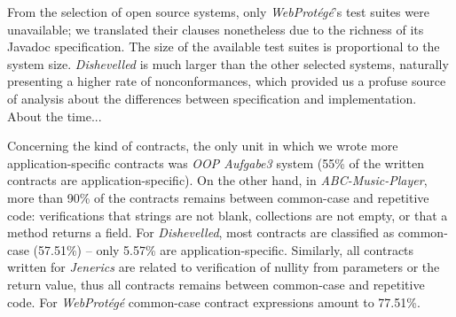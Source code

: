 


From the selection of open source systems, only \emph{WebProtégé}'s test suites were unavailable; we translated their clauses nonetheless due to the richness of its Javadoc specification.
The size of the available test suites is proportional to the system size.
\emph{Dishevelled} is much larger than the other selected systems, naturally presenting a higher rate of nonconformances, which provided us a profuse source of analysis about the differences between specification and implementation. 
About the time...



Concerning the kind of contracts, the only unit in which we wrote more
application-specific contracts was \emph{OOP Aufgabe3} system (55\% of the
written contracts are application-specific). On the other hand, in \emph{ABC-Music-Player}, more than 90\% of the contracts remains between common-case and repetitive code: verifications that strings are not blank, collections are not empty, or that a method returns a field.
For \emph{Dishevelled}, most contracts are classified as common-case (57.51\%) -- 
only 5.57\% are application-specific.
Similarly, all contracts written for \emph{Jenerics} are related to verification of nullity from parameters or the return value, thus all contracts
remains between common-case and repetitive code.
For \emph{WebProt\'{e}g\'{e}}  common-case contract expressions amount to 77.51\%.  


